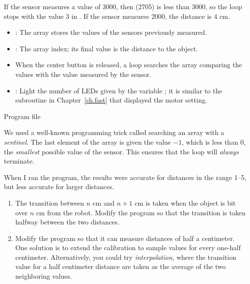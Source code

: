 If the sensor measures a value of 3000, then  (2705) is
less than 3000, so the loop stops with the value 3 in .
If the sensor measures 2000, the distance is 4 cm.


\begin{itemize}

\item {}: The array stores the values of the sensors
previously measured.

\item {}: The array index; its final value is the distance to
the object.

\end{itemize}


\begin{itemize}

\item When the center button is released, a loop searches the array
 comparing the values with the value measured by the
sensor.

\item {}: Light the number of LEDs given by the
variable ; it is similar to the subroutine in
Chapter~\ref{ch.fast} that displayed the motor setting.

\end{itemize}


{\raggedleft \hfill Program file }

We used a well-known programming trick called searching an array with a
\emph{sentinel}. The last element of the array is given the value $-1$,
which is less than $0$, the \emph{smallest} possible value of the
sensor. This ensures that the loop will \emph{always} terminate.


When I ran the program, the results were accurate for distances in the
range 1--5, but less accurate for larger distances.


\begin{enumerate}

\item The transition between $n$ cm and $n+1$ cm is taken when the
object is bit over $n$ cm from the robot. Modify the program so that
the transition is taken halfway between the two distances.

\item Modify the program so that it can measure distances of half a
centimeter. One solution is to extend the calibration to sample values
for every one-half centimeter. Alternatively, you could try
\emph{interpolation}, where the transition value for a half centimeter
distance are taken as the average of the two neighboring values.

\end{enumerate}
